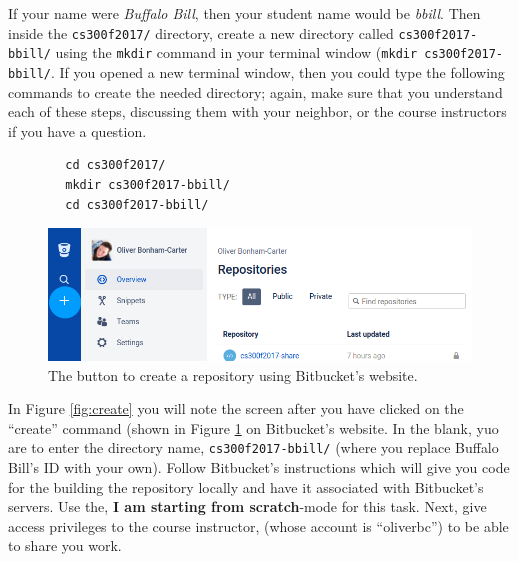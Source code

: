 


If your name were \emph{Buffalo Bill}, then your student name would be \emph{bbill}. Then inside the {\tt cs300f2017/} directory, create a new directory called {\tt cs300f2017-bbill/} using the {\tt mkdir} command in your terminal window ({\tt mkdir cs300f2017-bbill/}. If you opened a new terminal window, then you could type the following commands to create the needed directory; again, make sure that you understand each of these steps, discussing them with your neighbor, or the course instructors if you have a question.

    \vspace*{-.15in}
    \begin{verbatim}
        cd cs300f2017/
        mkdir cs300f2017-bbill/
        cd cs300f2017-bbill/
    \end{verbatim}
    \vspace*{-.33in} 



\begin{figure}[!ht]
\begin{center}
\includegraphics[scale=.5]{graphics/createButton_i.png} 
\end{center}
\caption{The button to create a repository using Bitbucket's website.}
\label{fig:createButton}
\end{figure}





\noindent In Figure \ref{fig:create} you will note the screen after you have clicked on the ``create'' command (shown in Figure \ref{fig:createButton} on Bitbucket's website. In the blank, yuo are to enter the directory name, {\tt cs300f2017-bbill/} (where you replace Buffalo Bill's ID with your own). Follow Bitbucket's instructions which will give you code for the building the repository locally and have it associated with Bitbucket's servers. Use the, \textbf{I am starting from scratch}-mode for this task. Next, give access privileges to the course instructor, (whose account is ``oliverbc'') to be able to share you work.


